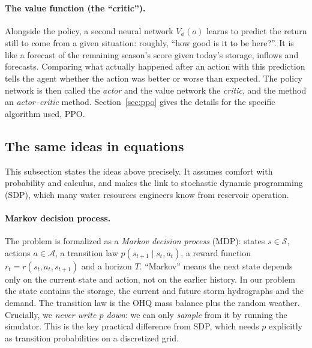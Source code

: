 \paragraph{The value function (the ``critic'').} Alongside the policy, a
second neural network $V_\phi(o)$ learns to predict the return still to
come from a given situation: roughly, ``how good is it to be here?''. It
is like a forecast of the remaining season's score given today's storage,
inflows and forecasts. Comparing what actually happened after an action
with this prediction tells the agent whether the action was better or
worse than expected. The policy network is then called the \emph{actor}
and the value network the \emph{critic}, and the method an
\emph{actor--critic} method. Section~\ref{sec:ppo} gives the details for
the specific algorithm used, PPO.

\subsection{The same ideas in equations}\label{sec:primer_math}
This subsection states the ideas above precisely. It assumes comfort with
probability and calculus, and makes the link to stochastic dynamic
programming (SDP), which many water resources engineers know from
reservoir operation.

\paragraph{Markov decision process.} The problem is formalized as a
\emph{Markov decision process} (MDP): states $s\in\mathcal S$, actions
$a\in\mathcal A$, a transition law $p(s_{t+1}\mid s_t,a_t)$, a reward
function $r_t=r(s_t,a_t,s_{t+1})$ and a horizon $T$. ``Markov'' means the
next state depends only on the current state and action, not on the
earlier history. In our problem the state contains the storage, the
current and future storm hydrographs and the demand. The transition law is
the OHQ mass balance plus the random weather. Crucially, we \emph{never
write $p$ down}: we can only \emph{sample} from it by running the
simulator. This is the key practical difference from SDP, which needs $p$
explicitly as transition probabilities on a discretized grid.

